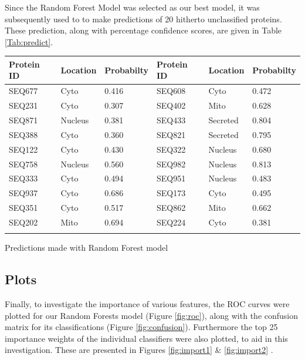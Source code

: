 \documentclass{bioinfo}
\begin{document}
Since the Random Forest Model was selected as our best model, it was subsequently used to to make predictions of 20 hitherto unclassified proteins. These prediction, along with percentage confidence scores, are given in Table \ref{Tab:predict}.

\begin{table}[!h]
 {\begin{tabular}{@{}lll|lll@{}}\toprule Protein ID  &  Location & Probabilty & Protein ID  &  Location & Probabilty\\\midrule
SEQ677 & Cyto & 0.416  & SEQ608 & Cyto & 0.472  \\
SEQ231 & Cyto & 0.307  & SEQ402 & Mito & 0.628  \\
SEQ871 & Nucleus & 0.381  & SEQ433 & Secreted & 0.804  \\
SEQ388 & Cyto & 0.360  & SEQ821 & Secreted & 0.795  \\
SEQ122 & Cyto & 0.430  & SEQ322 & Nucleus & 0.680  \\
SEQ758 & Nucleus & 0.560  & SEQ982 & Nucleus & 0.813  \\
SEQ333 & Cyto & 0.494  & SEQ951 & Nucleus & 0.483  \\
SEQ937 & Cyto & 0.686  & SEQ173 & Cyto & 0.495  \\
SEQ351 & Cyto & 0.517  & SEQ862 & Mito & 0.662  \\
SEQ202 & Mito & 0.694  & SEQ224 & Cyto & 0.381  \\\botrule
\end{tabular}}{Predictions made with Random Forest model}
\end{table}


\subsection{Plots}

Finally, to investigate the importance of various features, the ROC curves were plotted for our Random Forests model  (Figure \ref{fig:roc}), along with the confusion matrix for its classifications (Figure \ref{fig:confusion}). 
Furthermore the top 25 importance weights of the individual classifiers were also plotted, to aid in this investigation. 
These are presented in Figures \ref{fig:import1} \&  \ref{fig:import2} .

\end{document}
